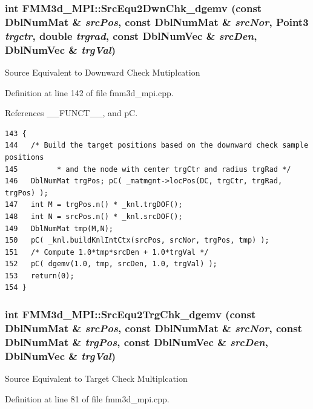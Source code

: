 \subsubsection{\setlength{\rightskip}{0pt plus 5cm}int FMM3d\_\-MPI::Src\-Equ2Dwn\-Chk\_\-dgemv (const Dbl\-Num\-Mat \& {\em src\-Pos}, const Dbl\-Num\-Mat \& {\em src\-Nor}, Point3 {\em trgctr}, double {\em trgrad}, const Dbl\-Num\-Vec \& {\em src\-Den}, Dbl\-Num\-Vec \& {\em trg\-Val})\hspace{0.3cm}{\tt  [protected]}}\label{classFMM3d__MPI_bba4100b4c9cc20e00e6e1b3969ee628_bba4100b4c9cc20e00e6e1b3969ee628}


Source Equivalent to Downward Check Mutiplcation 

Definition at line 142 of file fmm3d\_\-mpi.cpp.

References \_\-\_\-FUNCT\_\-\_\-, and p\-C.

\footnotesize\begin{verbatim}143 {
144   /* Build the target positions based on the downward check sample positions
145         * and the node with center trgCtr and radius trgRad */
146   DblNumMat trgPos; pC( _matmgnt->locPos(DC, trgCtr, trgRad, trgPos) );
147   int M = trgPos.n() * _knl.trgDOF();
148   int N = srcPos.n() * _knl.srcDOF();
149   DblNumMat tmp(M,N);
150   pC( _knl.buildKnlIntCtx(srcPos, srcNor, trgPos, tmp) );
151   /* Compute 1.0*tmp*srcDen + 1.0*trgVal */
152   pC( dgemv(1.0, tmp, srcDen, 1.0, trgVal) );
153   return(0);
154 }
\end{verbatim}\normalsize 


\subsubsection{\setlength{\rightskip}{0pt plus 5cm}int FMM3d\_\-MPI::Src\-Equ2Trg\-Chk\_\-dgemv (const Dbl\-Num\-Mat \& {\em src\-Pos}, const Dbl\-Num\-Mat \& {\em src\-Nor}, const Dbl\-Num\-Mat \& {\em trg\-Pos}, const Dbl\-Num\-Vec \& {\em src\-Den}, Dbl\-Num\-Vec \& {\em trg\-Val})\hspace{0.3cm}{\tt  [protected]}}\label{classFMM3d__MPI_3adc5bf96a97b455df85c08140bdae16_3adc5bf96a97b455df85c08140bdae16}


Source Equivalent to Target Check Multiplcation 

Definition at line 81 of file fmm3d\_\-mpi.cpp.

